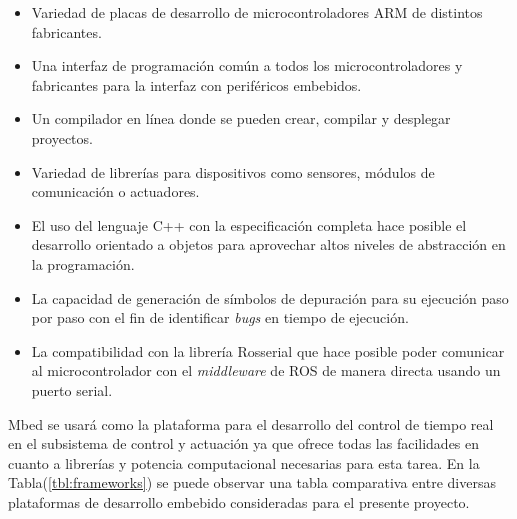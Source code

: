     \begin{itemize}
        \item Variedad de placas de desarrollo de microcontroladores ARM de distintos fabricantes.
        \item Una interfaz de programación común a todos los microcontroladores y fabricantes para la interfaz con 
        periféricos embebidos.
        \item Un compilador en línea donde se pueden crear, compilar y desplegar proyectos.
        \item Variedad de librerías para dispositivos como sensores, módulos de comunicación o actuadores.
        \item El uso del lenguaje C++ con la especificación completa hace posible el desarrollo orientado 
        a objetos para aprovechar altos niveles de abstracción en la programación.
        \item La capacidad de generación de símbolos de depuración para su ejecución paso por paso con el fin de 
        identificar \textit{bugs} en tiempo de ejecución.
        \item La compatibilidad con la librería Rosserial que hace posible poder comunicar al microcontrolador 
        con el \textit{middleware} de ROS de manera directa usando un puerto serial.
    \end{itemize}

    Mbed se usará como la plataforma para el desarrollo del control de tiempo real en el subsistema de control y actuación 
    ya que ofrece todas las facilidades en cuanto a librerías y potencia computacional necesarias para esta tarea. En la 
    Tabla(\ref{tbl:frameworks}) se puede observar una tabla comparativa entre diversas plataformas de desarrollo embebido 
    consideradas para el presente proyecto.


